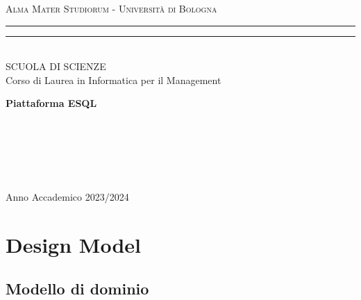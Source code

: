 \documentclass{article}
\begin{document}
\pagestyle{empty}

\begin{titlepage} 
\begin{center}
    {{\Large{\textsc{Alma Mater Studiorum - Università di Bologna}}}}
    \rule[0.1cm]{\textwidth}{0.1px}
    \rule[0.5cm]{\textwidth}{0.6px}\\
    {\large{SCUOLA DI SCIENZE \\ Corso di Laurea in Informatica per il Management}}
\end{center}

\vspace{50px}

\begin{center}
    {\LARGE{{\bf Piattaforma ESQL}}}\\
\end{center}

\vspace{115px}
\par
\noindent
\begin{minipage}[t]{0.04\textwidth}
~
\end{minipage}
\begin{minipage}[t]{0.4\textwidth}
\end{minipage}
\hfill
\begin{minipage}[t]{0.4\textwidth}\raggedleft
    {\\
}
\end{minipage}
\begin{minipage}[t]{0.04\textwidth}
~
\end{minipage}

\vspace*{210px}

\begin{center}
    \large{Anno Accademico 2023/2024}
\end{center}
\end{titlepage}

\section{Design Model}

\subsection{Modello di dominio} 
\large
\end{document}
